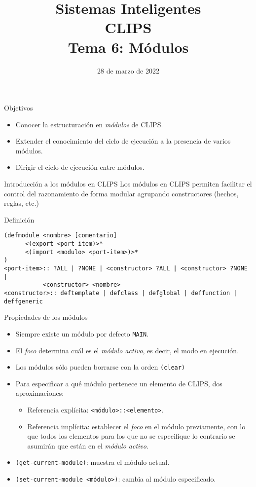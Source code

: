 \documentclass[usenames,dvipsnames,aspectratio=169]{beamer}
\title[]{{\LARGE Sistemas Inteligentes\\CLIPS}\\[0.5cm]Tema 6: Módulos}
\date[Marzo, 2022]{28 de marzo de 2022}
\author[A. Esteban]{\texorpdfstring{
    \begin{minipage}{0.47\linewidth}
        Aurora Esteban Toscano
        \pdfnewline
        \texttt{aestebant@uco.es}
    \end{minipage}
}{Aurora Esteban Toscano}
}
\institute{Grado en Ingeniería Informática, Universidad de Córdoba}
\begin{document}

\begin{frame}
\titlepage
\end{frame}

\begin{frame}{Objetivos}
	\begin{itemize}
		\item Conocer la estructuración en \textit{módulos} de CLIPS.
		\item Extender el conocimiento del ciclo de ejecución a la presencia de varios módulos.
		\item Dirigir el ciclo de ejecución entre módulos.
	\end{itemize}
\end{frame}

\begin{frame}[fragile]{Introducción a los módulos en CLIPS}
	Los módulos en CLIPS permiten facilitar el control del razonamiento de forma modular agrupando constructores (hechos, reglas, etc.)
	
	\begin{block}{Definición}
		\begin{verbatim}
(defmodule <nombre> [comentario]
      <(export <port-item)>*
      <(import <modulo> <port-item>)>*
)
<port-item>:: ?ALL | ?NONE | <constructor> ?ALL | <constructor> ?NONE |
           <constructor> <nombre>
<constructor>:: deftemplate | defclass | defglobal | deffunction | deffgeneric
		\end{verbatim}
	\end{block}
\end{frame}

\begin{frame}{Propiedades de los módulos}
	\begin{itemize}
		\item Siempre existe un módulo por defecto \texttt{MAIN}.
		\item El \textit{foco} determina cuál es el \textit{módulo activo}, es decir, el modo en ejecución.
		\item Los módulos sólo pueden borrarse con la orden \texttt{(clear)}
		\item Para especificar a qué módulo pertenece un elemento de CLIPS, dos aproximaciones:
		\begin{itemize}
			\item Referencia explícita: \texttt{<módulo>::<elemento>}.
			\item Referencia implícita: establecer el \textit{foco} en el módulo previamente, con lo que todos los elementos para los que no se especifique lo contrario se asumirán que están en el \textit{módulo activo}.
		\end{itemize}
		\item \texttt{(get-current-module)}: muestra el módulo actual.
		\item \texttt{(set-current-module <módulo>)}: cambia al módulo especificado.
	\end{itemize}
\end{frame}
\end{document}
